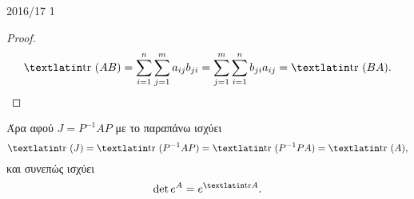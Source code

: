 \documentclass[a4paper,11pt]{article}
\begin{document}
\begin{solution}{2016/17 1}
\begin{proof}
\begin{equation*}
            \text{\tl{tr }}(AB) =
            \sum_{i=1}^n \sum_{j=1}^m a_{ij}b_{ji} =
            \sum_{j=1}^m \sum_{i=1}^n b_{ji}a_{ij} =
            \text{\tl{tr }}(BA).
        \end{equation*}
    \end{proof}
    Άρα αφού \( J = P^{-1}AP \) με το παραπάνω ισχύει
    \begin{equation*}
        \text{\tl{tr }}(J) =
        \text{\tl{tr }}(P^{-1}AP) =
        \text{\tl{tr }}(P^{-1}PA) =
        \text{\tl{tr }}(A),
    \end{equation*}
    και συνεπώς ισχύει
    \begin{equation*}
        \det e^A = e^{\text{\tl{tr}}A}.
    \end{equation*}
\end{solution}
\end{document}

